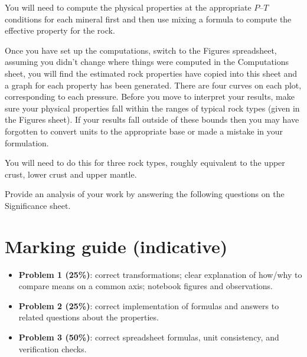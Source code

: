 \documentclass[11pt,a4paper]{article}
\begin{document}
You will need to compute the physical properties at the appropriate $P$--$T$ conditions for each mineral first and then use mixing a formula to compute the effective property for the rock.

Once you have set up the computations, switch to the Figures spreadsheet, assuming you didn't change where things were computed in the Computations sheet, you will find the estimated rock properties have copied into this sheet and a graph for each property has been generated.  There are four curves on each plot, corresponding to each pressure.  Before you move to interpret your results, make sure your physical properties fall within the ranges of typical rock types (given in the Figures sheet).  If your results fall outside of these bounds then you may have forgotten to convert units to the appropriate base or made a mistake in your formulation.

You will need to do this for three rock types, roughly equivalent to the upper crust, lower crust and upper mantle.

Provide an analysis of your work by answering the following questions on the Significance sheet.

\section*{Marking guide (indicative)}
\begin{itemize}[leftmargin=*]
  \item \textbf{Problem 1 (25\%)}: correct transformations; clear explanation of how/why to compare means on a common axis; notebook figures and observations.
  \item \textbf{Problem 2 (25\%)}: correct implementation of formulas and answers to related questions about the properties.
  \item \textbf{Problem 3 (50\%)}: correct spreadsheet formulas, unit consistency, and verification checks.
\end{itemize}
\end{document}
